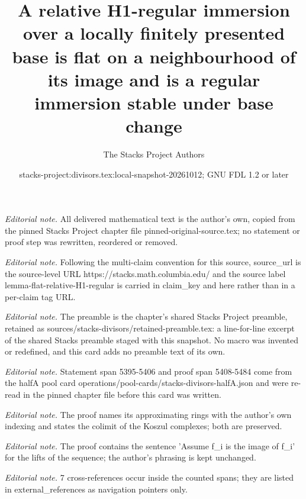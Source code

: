 \documentclass[10pt,a4paper]{amsart}
\title{A relative H1-regular immersion over a locally finitely presented base is flat on a neighbourhood of its image and is a regular immersion stable under base change}
\author{The Stacks Project Authors}
\date{stacks-project:divisors.tex:local-snapshot-20261012; GNU FDL 1.2 or later}
\theoremstyle{plain}
\theoremstyle{definition}
\theoremstyle{remark}
\numberwithin{equation}{subsection}
\begin{document}
\maketitle
\noindent\textit{Editorial note.} All delivered mathematical text is the author's own, copied from the pinned Stacks Project chapter file pinned-original-source.tex; no statement or proof step was rewritten, reordered or removed.\par\medskip
\noindent\textit{Editorial note.} Following the multi-claim convention for this source, source\_url is the source-level URL https://stacks.math.columbia.edu/ and the source label lemma-flat-relative-H1-regular is carried in claim\_key and here rather than in a per-claim tag URL.\par\medskip
\noindent\textit{Editorial note.} The preamble is the chapter's shared Stacks Project preamble, retained as sources/stacks-divisors/retained-preamble.tex: a line-for-line excerpt of the shared Stacks preamble staged with this snapshot. No macro was invented or redefined, and this card adds no preamble text of its own.\par\medskip
\noindent\textit{Editorial note.} Statement span 5395-5406 and proof span 5408-5484 come from the halfA pool card operations/pool-cards/stacks-divisors-halfA.json and were re-read in the pinned chapter file before this card was written.\par\medskip
\noindent\textit{Editorial note.} The proof names its approximating rings with the author's own indexing and states the colimit of the Koszul complexes; both are preserved.\par\medskip
\noindent\textit{Editorial note.} The proof contains the sentence 'Assume f\_i is the image of f\_i' for the lifts of the sequence; the author's phrasing is kept unchanged.\par\medskip
\noindent\textit{Editorial note.} 7 cross-references occur inside the counted spans; they are listed in external\_references as navigation pointers only.\par\medskip
\end{document}
